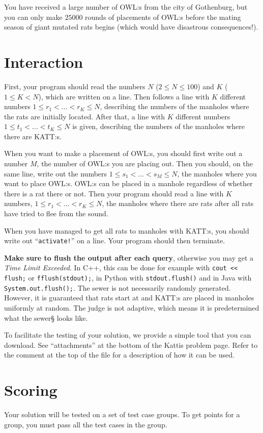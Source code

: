 You have received a large number of OWL:s from the city of Gothenburg, but you can only make $25000$ rounds of placements of OWL:s before
the mating season of giant mutated rats begins (which would have disastrous consequences!).

\section*{Interaction}
First, your program should read the numbers $N$ ($2 \leq N \leq 100$) and $K$ ($1 \leq K < N$), which are written on a line.
Then follows a line with $K$ different numbers $1 \leq r_1 < ... < r_K \leq N$, describing the numbers of the manholes where the rats are initially located.
After that, a line with $K$ different numbers $1 \leq t_1 < ... < t_K \leq N$ is given, describing the numbers of the manholes where there are KATT:s.

When you want to make a placement of OWL:s, you should first write out a number $M$, the number of OWL:s you are placing out.
Then you should, on the same line, write out the numbers $1 \leq s_1 < ... < s_M \leq N$,
the manholes where you want to place OWL:s. OWL:s can be placed in a manhole regardless of whether there is a rat there or not.
Then your program should read a line with $K$ numbers, $1 \leq r_1 < ... < r_K \leq N$,
the manholes where there are rats after all rats have tried to flee from the sound.

When you have managed to get all rats to manholes with KATT:s, you should write out ``\texttt{activate!}'' on a line.
Your program should then terminate.

\textbf{Make sure to flush the output after each query}, otherwise you may get a \textit{Time Limit Exceeded}.
In C++, this can be done for example with \texttt{cout << flush;}
or \texttt{fflush(stdout);},
in Python with \texttt{stdout.flush()}
and in Java with \texttt{System.out.flush();}.
The sewer is not necessarily randomly generated.
However, it is guaranteed that rats start at and KATT:s are placed in manholes uniformly at random.
The judge is not adaptive, which means it is predetermined what the sewer§ looks like.

To facilitate the testing of your solution, we provide a simple tool that you can download. See ``attachments''
at the bottom of the Kattis problem page. Refer to the comment at the top of the file for a description of how it can be used.

\section*{Scoring}
Your solution will be tested on a set of test case groups.
To get points for a group, you must pass all the test cases in the group.

